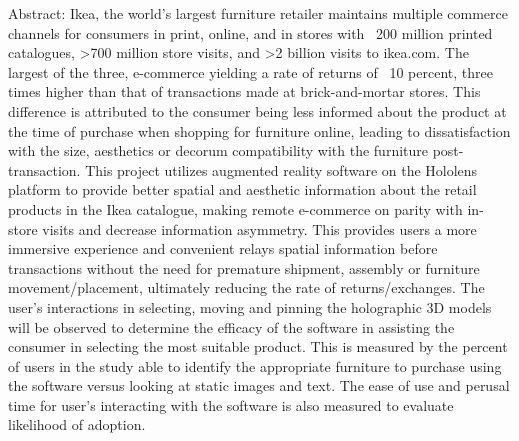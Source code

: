 Abstract:
	Ikea, the world's largest furniture retailer maintains multiple commerce channels for consumers
in print, online, and in stores with ~200 million printed catalogues, >700 million store visits,
and >2 billion visits to ikea.com. The largest of the three, e-commerce yielding a rate of returns
of ~10 percent, three times higher than that of transactions made at brick-and-mortar stores. This
difference is attributed to the consumer being less informed about the product at the time of
purchase when shopping for furniture online, leading to dissatisfaction with the size, aesthetics
or decorum compatibility with the furniture post-transaction.
	This project utilizes augmented reality software on the Hololens platform to provide better spatial
and aesthetic information about the retail products in the Ikea catalogue, making remote e-commerce
on parity with in-store visits and decrease information asymmetry. This provides users a more
immersive experience and convenient relays spatial information before transactions without the need
for premature shipment, assembly or furniture movement/placement, ultimately reducing the rate of
returns/exchanges.
	The user's interactions in selecting, moving and pinning the holographic 3D models will be observed to
determine the efficacy of the software in assisting the consumer in selecting the most suitable product.
This is measured by the percent of users in the study able to identify the appropriate furniture to purchase
using the software versus looking at static images and text. The ease of use and perusal time for user's
interacting with the software is also measured to evaluate likelihood of adoption.
